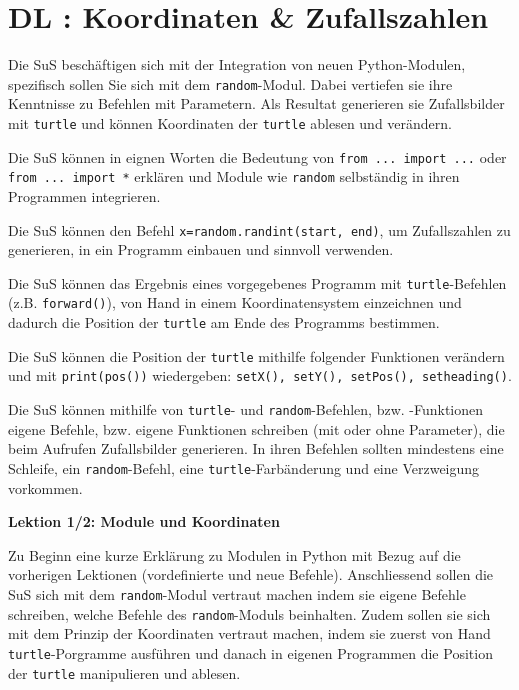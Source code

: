 \section{DL \themycounter: Koordinaten \& Zufallszahlen}
\begin{myExBox}[title=DL \themycounter]
Die SuS beschäftigen sich mit der Integration von neuen Python-Modulen, spezifisch sollen Sie sich mit dem \lstinline|random|-Modul. Dabei vertiefen sie ihre Kenntnisse zu Befehlen mit Parametern. Als Resultat generieren sie Zufallsbilder mit \lstinline|turtle| und können Koordinaten der \lstinline|turtle| ablesen und verändern.


\begin{todolist}
    \item Die SuS können in eignen Worten die Bedeutung von \lstinline|from ... import ...| oder \lstinline|from ... import *| erklären und Module wie \lstinline|random| selbständig in ihren Programmen integrieren.
    \item Die SuS können den Befehl \lstinline|x=random.randint(start, end)|, um Zufallszahlen zu generieren, in ein Programm einbauen und sinnvoll verwenden.
    \item Die SuS können das Ergebnis eines vorgegebenes Programm mit \lstinline|turtle|-Befehlen (z.B. \lstinline|forward()|), von Hand in einem Koordinatensystem einzeichnen und dadurch die Position der \lstinline|turtle| am Ende des Programms bestimmen.
    \item Die SuS können die Position der \lstinline|turtle| mithilfe folgender Funktionen verändern und mit \lstinline|print(pos())| wiedergeben: \lstinline|setX(), setY(), setPos(), setheading()|. 
    \item Die SuS können mithilfe von \lstinline|turtle|- und \lstinline|random|-Befehlen, bzw. -Funktionen eigene Befehle, bzw. eigene Funktionen schreiben (mit oder ohne Parameter), die beim Aufrufen Zufallsbilder generieren. In ihren Befehlen sollten mindestens eine Schleife, ein \lstinline|random|-Befehl, eine \lstinline|turtle|-Farbänderung und eine Verzweigung vorkommen.
\end{todolist}

\textbf{Lektion 1/2: Module und Koordinaten}

Zu Beginn eine kurze Erklärung zu Modulen in Python mit Bezug auf die vorherigen Lektionen (vordefinierte und neue Befehle). Anschliessend sollen die SuS sich mit dem \lstinline|random|-Modul vertraut machen indem sie eigene Befehle schreiben, welche Befehle des \lstinline|random|-Moduls beinhalten. Zudem sollen sie sich mit dem Prinzip der Koordinaten vertraut machen, indem sie zuerst von Hand \lstinline|turtle|-Porgramme ausführen und danach in eigenen Programmen die Position der \lstinline|turtle| manipulieren und ablesen.


\end{myExBox}
